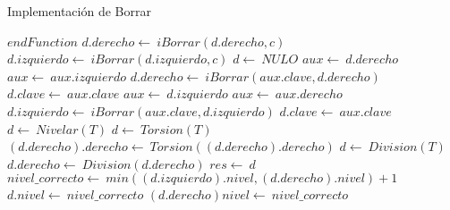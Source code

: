 \begin{algorithm}
\caption{Implementaci\'on de Borrar}
\begin{algorithmic}[0]
		\State $endFunction$
		\State $d.derecho\gets \ iBorrar(d.derecho, c)$
		\State $d.izquierdo\gets \ iBorrar(d.izquierdo, c)$
		\State $d\gets\ NULO$
		\State $aux\gets\ d.derecho$
			\State $aux\gets\ aux.izquierdo$
		\EndWhile
		\State $d.derecho\gets\ iBorrar(aux.clave, d.derecho)$
		\State $d.clave\gets\ aux.clave$
	\Else
		\State $aux\gets\ d.izquierdo$
			\State $aux\gets\ aux.derecho$
		\EndWhile
		\State $d.izquierdo\gets\ iBorrar(aux.clave, d.izquierdo)$
		\State $d.clave\gets\ aux.clave$
	\EndIf
	\State $d\gets\ Nivelar(T)$
	\State $d\gets\ Torsion(T)$
		\State $(d.derecho).derecho\gets\ Torsion((d.derecho).derecho)$
	\EndIf
	\State $d\gets\ Division(T)$
	\State $d.derecho\gets\ Division(d.derecho)$
	\State $res\gets\ d$
\EndFunction
{}
	\State $nivel\_correcto\gets\ min((d.izquierdo).nivel, (d.derecho).nivel)+1$
		\State $d.nivel\gets\ nivel\_correcto$	
			\State $(d.derecho)nivel\gets\ nivel\_correcto$
		\EndIf
	\EndIf
\EndProcedure
\end{algorithmic}
\end{algorithm}


